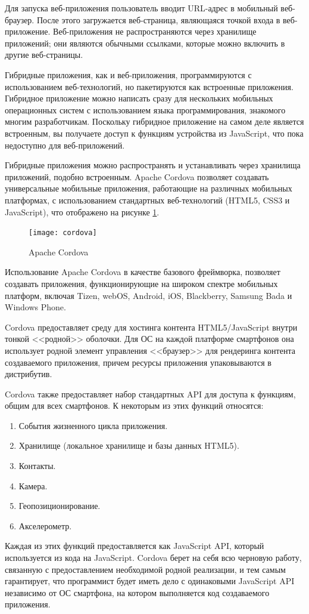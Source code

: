 Для запуска веб-приложения пользователь вводит URL-адрес в мобильный веб-браузер. После этого загружается веб-страница, являющаяся точкой входа в веб-приложение. Веб-приложения не распространяются через хранилище приложений; они являются обычными ссылками, которые можно включить в другие веб-страницы.

Гибридные приложения, как и веб-приложения, программируются с использованием веб-технологий, но пакетируются как встроенные приложения. Гибридное приложение можно написать сразу для нескольких мобильных операционных систем с использованием языка программирования, знакомого многим разработчикам. Поскольку гибридное приложение на самом деле является встроенным, вы получаете доступ к функциям устройства из JavaScript, что пока недоступно для веб-приложений.

Гибридные приложения можно распространять и устанавливать через хранилища приложений, подобно встроенным. Apache Cordova позволяет создавать универсальные мобильные приложения, работающие на различных мобильных платформах, с использованием стандартных веб-технологий (HTML5, CSS3 и JavaScript), что отображено на рисунке \ref{cordova}.

\begin{figure}[ht]
\center\texttt{[image: cordova]}
\caption{Apache Cordova}\label{cordova}
\end{figure}

Использование Apache Cordova в качестве базового фреймворка, позволяет создавать приложения, функционирующие на широком спектре мобильных платформ, включая Tizen, webOS, Android, iOS, Blackberry, Samsung Bada и Windows Phone\cite{cordova}.

Cordova предоставляет среду для хостинга контента HTML5/JavaScript внутри тонкой <<родной>> оболочки. Для ОС на каждой платформе смартфонов она использует родной элемент управления <<браузер>> для рендеринга контента создаваемого приложения, причем ресурсы приложения упаковываются в дистрибутив.

Cordova также предоставляет набор стандартных API для доступа к функциям, общим для всех смартфонов. К некоторым из этих функций относятся:
\begin{enumerate}
\item События жизненного цикла приложения.
\item Хранилище (локальное хранилище и базы данных HTML5).
\item Контакты.
\item Камера.
\item Геопозиционирование.
\item Акселерометр.
\end{enumerate}
Каждая из этих функций предоставляется как JavaScript API, который используется из кода на JavaScript. Cordova берет на себя всю черновую работу, связанную с предоставлением необходимой родной реализации, и тем самым гарантирует, что программист будет иметь дело с одинаковыми JavaScript API независимо от ОС смартфона, на котором выполняется код создаваемого приложения. 


